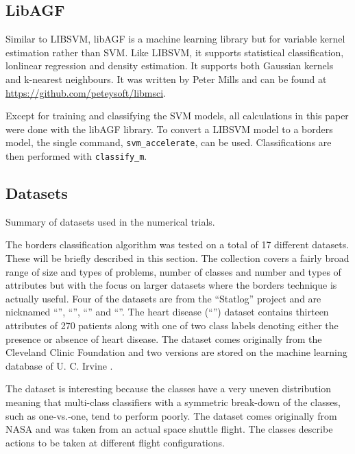 \subsection{LibAGF}

Similar to LIBSVM, libAGF is a machine learning library but for variable kernel 
estimation \citep{Mills2011,Terrell_Scott1992} rather than SVM.
Like LIBSVM, it supports statistical classification, lonlinear regression
and density estimation.
It supports both Gaussian kernels and k-nearest neighbours.
It was written by Peter Mills and can be found at
\url{https://github.com/peteysoft/libmsci}.

Except for training and classifying the SVM models, all calculations in this paper were done 
with the libAGF library. To convert a LIBSVM model to a borders model,
the single command, \verb/svm_accelerate/, can be used.
Classifications are then performed with \verb/classify_m/.

\subsection{Datasets}

\label{datasets}

\begin{table}
	\caption{Summary of datasets used in the numerical trials.}
	\label{summary}
	
\end{table}

The borders classification algorithm was tested on a total of 
17 different datasets.
These will be briefly described in this section.
The collection covers a fairly broad range of size and types of problems, 
number of classes and number and types of attributes but with
the focus on larger datasets where the borders technique is actually useful.
Four of the datasets are from
the ``Statlog'' project \citep{Michie_etal1994,King_etal1995} 
and are nicknamed ``'', ``'', ``'' and ``''.
The heart disease (``'') dataset 
contains thirteen attributes of 270 patients along with one of two class labels denoting either the presence or absence of heart disease.
The dataset comes originally from the Cleveland Clinic Foundation and two versions are stored on the machine learning database of U. C. Irvine \citep{Lichman2013}.

The  dataset is interesting because 
the classes have a very uneven distribution meaning that multi-class
classifiers
with a symmetric break-down of the classes, 
such as one-vs.-one,
tend to perform poorly.
The  dataset comes originally
from NASA and was taken from an actual space shuttle flight.
The classes describe actions to be taken at different flight configurations.

